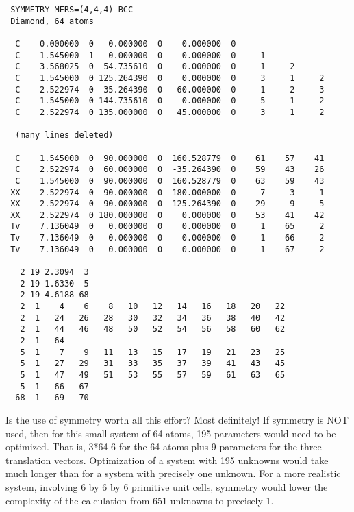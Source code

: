 \begin{verbatim}
 SYMMETRY MERS=(4,4,4) BCC 
 Diamond, 64 atoms

  C    0.000000  0   0.000000  0    0.000000  0
  C    1.545000  1   0.000000  0    0.000000  0     1
  C    3.568025  0  54.735610  0    0.000000  0     1     2
  C    1.545000  0 125.264390  0    0.000000  0     3     1     2
  C    2.522974  0  35.264390  0   60.000000  0     1     2     3
  C    1.545000  0 144.735610  0    0.000000  0     5     1     2
  C    2.522974  0 135.000000  0   45.000000  0     3     1     2
  
  (many lines deleted) 
 
  C    1.545000  0  90.000000  0  160.528779  0    61    57    41
  C    2.522974  0  60.000000  0  -35.264390  0    59    43    26
  C    1.545000  0  90.000000  0  160.528779  0    63    59    43
 XX    2.522974  0  90.000000  0  180.000000  0     7     3     1
 XX    2.522974  0  90.000000  0 -125.264390  0    29     9     5
 XX    2.522974  0 180.000000  0    0.000000  0    53    41    42
 Tv    7.136049  0   0.000000  0    0.000000  0     1    65     2
 Tv    7.136049  0   0.000000  0    0.000000  0     1    66     2
 Tv    7.136049  0   0.000000  0    0.000000  0     1    67     2

   2 19 2.3094  3
   2 19 1.6330  5
   2 19 4.6188 68
   2  1    4    6    8   10   12   14   16   18   20   22
   2  1   24   26   28   30   32   34   36   38   40   42
   2  1   44   46   48   50   52   54   56   58   60   62
   2  1   64
   5  1    7    9   11   13   15   17   19   21   23   25
   5  1   27   29   31   33   35   37   39   41   43   45
   5  1   47   49   51   53   55   57   59   61   63   65
   5  1   66   67
  68  1   69   70
\end{verbatim} 

Is the use of symmetry worth all this effort? Most 
definitely! If symmetry is NOT used, then for this small system of 
64 atoms, 195 parameters would need to be optimized. That is, 
3*64-6 for the 64 atoms plus 9 parameters for the three 
translation vectors. Optimization of a system with 195 unknowns 
would take much longer than for a system with precisely one 
unknown. For a more realistic system, involving 6 by 6 by 6 
primitive unit cells, symmetry would lower the complexity of the 
calculation from 651 unknowns to precisely 1. 
